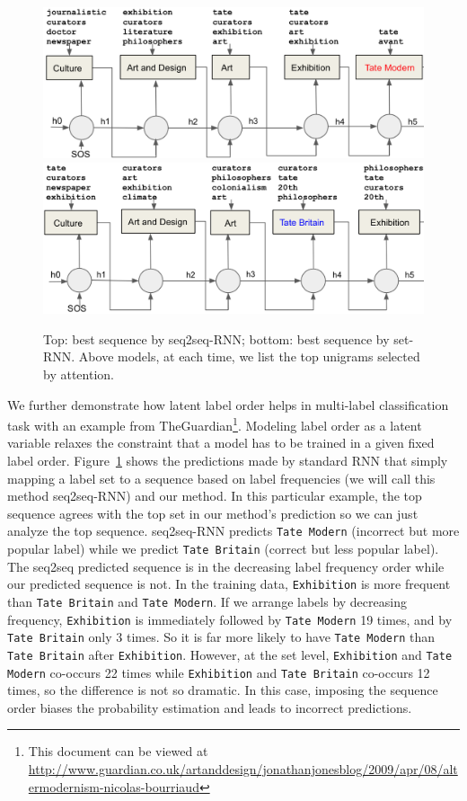 \begin{figure}[t]
\centering
\includegraphics[width=0.8\columnwidth]{Images/train_sequence.png}
\includegraphics[width=0.8\columnwidth]{Images/train_set.png}

\caption{Top: best sequence by seq2seq-RNN; bottom: best sequence by set-RNN. Above models, at each time, we list the top unigrams selected by attention.}
\label{fig:models}
\end{figure}
We further demonstrate how latent label order helps in multi-label classification task with an example from TheGuardian\footnote{\scriptsize This document can be viewed at \url{http://www.guardian.co.uk/artanddesign/jonathanjonesblog/2009/apr/08/altermodernism-nicolas-bourriaud}}. Modeling label order as a latent variable relaxes the constraint that a model has to be trained in a given fixed label order. Figure~\ref{fig:models} shows the predictions made by standard RNN that simply mapping a label set to a sequence based on label frequencies (we will call this method seq2seq-RNN) and our method. In this particular example, the top sequence agrees with the top set in our method's prediction so we can just analyze the top sequence. seq2seq-RNN predicts \texttt{Tate Modern} (incorrect but more popular label) while we predict \texttt{Tate Britain} (correct but less popular label). The seq2seq predicted sequence is in the decreasing label frequency order while our predicted sequence is not. In the training data, \texttt{Exhibition} is more frequent than \texttt{Tate Britain} and \texttt{Tate Modern}. If we arrange labels by decreasing frequency, \texttt{Exhibition} is immediately followed by \texttt{Tate Modern} 19 times, and by \texttt{Tate Britain} only 3 times. So it is far more likely to have \texttt{Tate Modern} than \texttt{Tate Britain} after \texttt{Exhibition}. However, at the set level, \texttt{Exhibition} and \texttt{Tate Modern} co-occurs 22 times while \texttt{Exhibition} and \texttt{Tate Britain} co-occurs 12 times, so the difference is not so dramatic. In this case, imposing the sequence order biases the probability estimation and leads to incorrect predictions.
